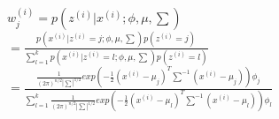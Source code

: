 \begin{answer}\\
$w^{(i)}_j=p(z^{(i)}|x^{(i)};\phi, \mu, \sum)$\\
$=\frac{p(x^{(i)}|z^{(i)}=j;\phi, \mu, \sum)p(z^{(i)}=j)}{\sum_{l=1}^{k}p(x^{(i)}|z^{(i)}=l;\phi, \mu, \sum)p(z^{(i)}=l)}$\\
$=\frac{\frac{1}{(2 \pi)^{n/2}|\sum|^{1/2}}exp(-\frac{1}{2}(x^{(i)}-\mu_j)^T\sum^{-1}(x^{(i)}-\mu_j))\phi_j}{\sum_{l=1}^{k} \frac{1}{(2 \pi)^{n/2}|\sum|^{1/2}}exp(-\frac{1}{2}(x^{(i)}-\mu_l)^T\sum^{-1}(x^{(i)}-\mu_l))\phi_l}$
\end{answer}
